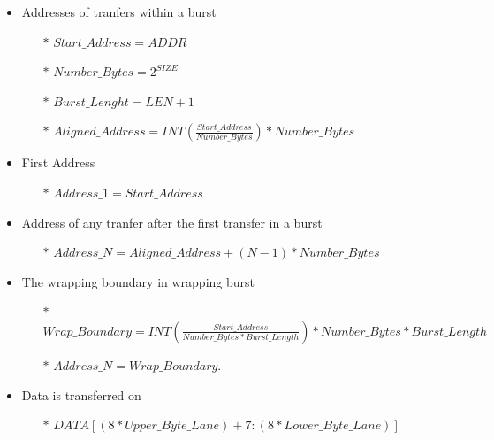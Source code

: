 \documentclass{article}
\begin{document}
\begin{itemize}
    \item Addresses of tranfers within a burst
    \begin{itemize}
        \item[$*$] $Start\_Address = ADDR$
        \item[$*$] $Number\_Bytes = 2^{SIZE}$
        \item[$*$] $Burst\_Lenght = LEN + 1 $
        \item[$*$] $Aligned\_Address = INT(\frac{Start\_Address}{Number\_Bytes}) * Number\_Bytes$
    \end{itemize}
    \item First Address
    \begin{itemize}
        \item[$*$] $Address\_1 = Start\_Address$
    \end{itemize}
    \item Address of any tranfer after the first transfer in a burst
    \begin{itemize}
        \item[$*$] $Address\_N = Aligned\_Address + (N-1)*Number\_Bytes$
    \end{itemize}
    \item The wrapping boundary in wrapping burst
    \begin{itemize}
        \item[$*$] $Wrap\_Boundary = INT(\frac{Start\_Address}{Number\_Bytes * Burst\_Length}) * Number\_Bytes * Burst\_Length$ 
        \item[$*$] $Address\_N = Wrap\_Boundary$. 
    \end{itemize}
    \item Data is transferred on
    \begin{itemize}
        \item[$*$] $DATA[(8*Upper\_Byte\_Lane) + 7 : (8*Lower\_Byte\_Lane)]$
    \end{itemize}
\end{itemize}
\end{document}
